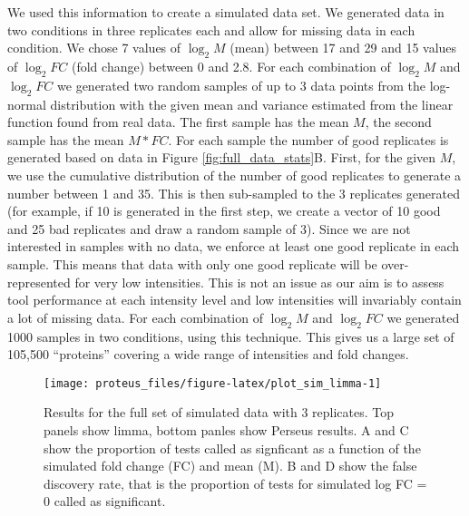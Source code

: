 \documentclass[]{article}
\begin{document}
We used this information to create a simulated data set. We generated
data in two conditions in three replicates each and allow for missing
data in each condition. We chose 7 values of \(\log_2 M\) (mean) between
17 and 29 and 15 values of \(\log_2 FC\) (fold change) between 0 and
2.8. For each combination of \(\log_2 M\) and \(\log_2 FC\) we generated
two random samples of up to 3 data points from the log-normal
distribution with the given mean and variance estimated from the linear
function found from real data. The first sample has the mean \(M\), the
second sample has the mean \(M * FC\). For each sample the number of
good replicates is generated based on data in Figure
\ref{fig:full_data_stats}B. First, for the given \(M\), we use the
cumulative distribution of the number of good replicates to generate a
number between 1 and 35. This is then sub-sampled to the 3 replicates
generated (for example, if 10 is generated in the first step, we create
a vector of 10 good and 25 bad replicates and draw a random sample of
3). Since we are not interested in samples with no data, we enforce at
least one good replicate in each sample. This means that data with only
one good replicate will be over-represented for very low intensities.
This is not an issue as our aim is to assess tool performance at each
intensity level and low intensities will invariably contain a lot of
missing data. For each combination of \(\log_2 M\) and \(\log_2 FC\) we
generated 1000 samples in two conditions, using this technique. This
gives us a large set of 105,500 ``proteins'' covering a wide range of
intensities and fold changes.

\begin{figure}[H]

{\centering \texttt{[image: proteus\_files/figure-latex/plot\_sim\_limma-1]} 

}

\caption{\label{fig:simulation_rates}Results for the full set of simulated data with 3 replicates. Top panels show limma, bottom panles show Perseus results. A and C show the proportion of tests called as signficant as a function of the simulated fold change (FC) and mean (M). B and D show the false discovery rate, that is the proportion of tests for simulated log FC = 0 called as significant.}\label{fig:plot_sim_limma}
\end{figure}
\end{document}
